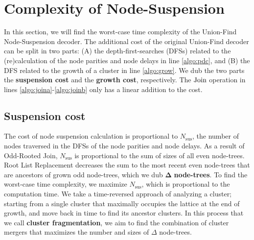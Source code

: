 
\section{Complexity of Node-Suspension}\label{sec:complexity}

In this section, we will find the worst-case time complexity of the Union-Find Node-Suspension decoder. The additional cost of the original Union-Find decoder can be split in two parts: (A) the depth-first-searches (DFSs) related to the (re)calculation of the node parities and node delays in line \ref{algo:pdc}, and (B) the DFS related to the growth of a cluster in line \ref{algo:grow}. We dub the two parts the \textbf{suspension cost} and the \textbf{growth cost}, respectively. The $\operatorname{Join}$ operation in lines \ref{algo:joina}-\ref{algo:joinb} only has a linear addition to the cost.

\subsection{Suspension cost}\label{sec:suscomplexity}

The cost of node suspension calculation is proportional to $N_{\text{sus}}$, the number of nodes traversed in the DFSs of the node parities and node delays. As a result of Odd-Rooted Join, $N_{\text{sus}}$ is proportional to the sum of sizes of all even node-trees. Root List Replacement decreases the sum to the most recent even node-trees that are ancestors of grown odd node-trees, which we dub $\mathbf{\Delta}$ \textbf{node-trees}. To find the worst-case time complexity, we maximize $N_{\text{sus}}$, which is proportional to the computation time. We take a time-reversed approach of analyzing a cluster; starting from a single cluster that maximally occupies the lattice at the end of growth, and move back in time to find its ancestor clusters. In this process that we call \textbf{cluster fragmentation}, we aim to find the combination of cluster mergers that maximizes the number and sizes of $\Delta$ node-trees. 




